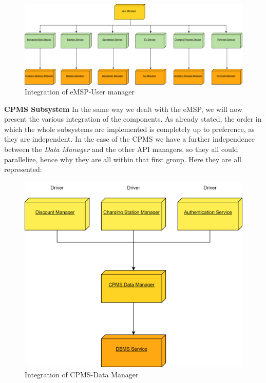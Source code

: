 \documentclass[table, 12pt]{article}
\begin{document}
\begin{figure}[H]
    \centering
    \includegraphics[scale=0.5]{assets/Integration Diagrams/eMSP-User Manager.png} 
    \caption{Integration of eMSP-User manager}%
    \label{fig: eMSP-User manager}%
\end{figure}

\newpage
\textbf{CPMS Subsystem} \newline
In the same way we dealt with the eMSP, we will now present the various integration of the components. As already stated, the order in which the whole subsystems are implemented is 
completely up to preference, as they are independent. \newline
In the case of the CPMS we have a further independence between the \emph{Data Manager} and the other API managers, so they all could parallelize, hence why they are all within that first group.
Here they are all represented:

\begin{figure}[H]
    \centering
    \includegraphics[scale=0.6]{assets/Integration Diagrams/CPMS-Data Manager.png} 
    \caption{Integration of CPMS-Data Manager}%
    \label{fig: CPMS-Data manager}%
\end{figure}
\end{document}
